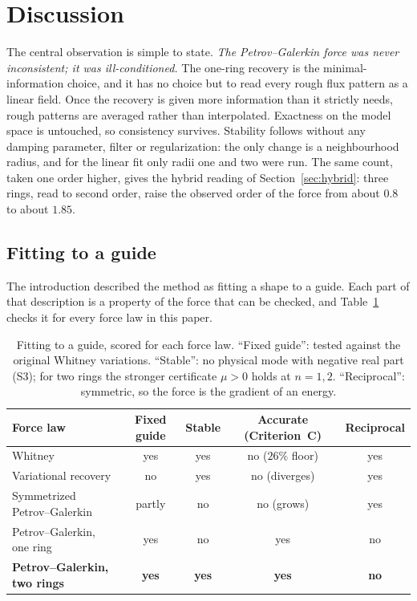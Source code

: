\documentclass[11pt]{article}
\theoremstyle{definition}
\theoremstyle{remark}
\newcommand{\BW}{Criterion~C}
\begin{document}
\section{Discussion}\label{sec:discussion}

The central observation is simple to state. \emph{The Petrov--Galerkin force was never
inconsistent; it was ill-conditioned.} The one-ring recovery is the minimal-information
choice, and it has no choice but to read every rough flux pattern as a linear field. Once
the recovery is given more information than it strictly needs, rough patterns are
averaged rather than interpolated. Exactness on the model space is untouched, so
consistency survives. Stability follows without any damping parameter, filter or
regularization: the only change is a neighbourhood radius, and for the linear fit
only radii one and two were run. The same count, taken one order higher, gives the hybrid reading of
Section~\ref{sec:hybrid}: three rings, read to second order, raise the observed order of the
force from about $0.8$ to about $1.85$.

\subsection{Fitting to a guide}\label{sec:magnet}

The introduction described the method as fitting a shape to a guide. Each part of that
description is a property of the force that can be checked, and Table~\ref{tab:guide}
checks it for every force law in this paper.

\begin{table}[H]\centering\small
\caption{Fitting to a guide, scored for each force law. ``Fixed guide'': tested against
the original Whitney variations. ``Stable'': no physical mode with negative real part
(S3); for two rings the stronger certificate $\mu>0$ holds at $n=1,2$. ``Reciprocal'':
symmetric, so the force is the gradient of an energy.}
\label{tab:guide}
\begin{tabular}{lcccc}\toprule
Force law & Fixed guide & Stable & Accurate (\BW{}) & Reciprocal \\ \midrule
Whitney & yes & yes & no ($26\%$ floor) & yes \\
Variational recovery & no & yes & no (diverges) & yes \\
Symmetrized Petrov--Galerkin & partly & no & no (grows) & yes \\
Petrov--Galerkin, one ring & yes & no & yes & no \\
\textbf{Petrov--Galerkin, two rings} & \textbf{yes} & \textbf{yes} & \textbf{yes} & \textbf{no} \\
\bottomrule\end{tabular}
\end{table}
\end{document}
